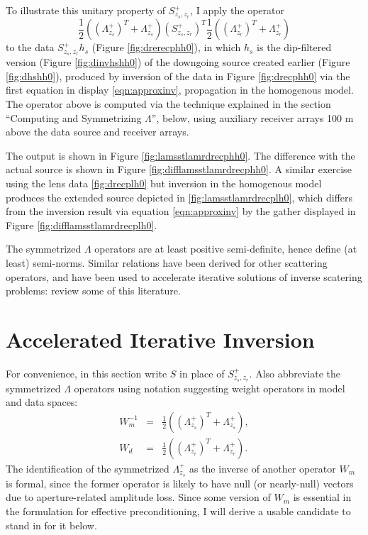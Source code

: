 To illustrate this unitary property of $S^+_{z_s,z_r}$, I apply the
operator
\[
  \frac{1}{2}((\Lambda^+_{z_s})^T+ \Lambda^+_{z_s})
  (S^{+}_{z_s,z_r})^T \frac{1}{2}((\Lambda^+_{z_r})^T+
  \Lambda^+_{z_r})
\]
to the data $S^+_{z_s,z_r}h_s$ (Figure \ref{fig:drerecphh0}), in which
$h_s$ is the dip-filtered version (Figure \ref{fig:dinvhshh0}) of the
downgoing source created earlier (Figure \ref{fig:dhshh0}), produced
by inversion of the data in Figure \ref{fig:drecphh0} via the first
equation in display \ref{eqn:approxinv}, propagation in the homogenous
model.  The operator above is computed via the technique explained in
the section ``Computing and Symmetrizing $\Lambda$'', below, using
auxiliary receiver arrays 100 m above the data source and receiver arrays.

The output is shown in Figure
\ref{fig:lamsstlamrdrecphh0}. The difference with the actual source is
shown in Figure \ref{fig:difflamsstlamrdrecphh0}. A similar exercise
using the lens data \ref{fig:drecplh0} but inversion in the homogenous
model produces the extended source depicted in
\ref{fig:lamsstlamrdrecplh0}, which differs from the inversion result
via equation \ref{eqn:approxinv} by the gather displayed in Figure
\ref{fig:difflamsstlamrdrecplh0}.

The symmetrized $\Lambda$ operators are at least positive
semi-definite, hence define (at least) semi-norms.
Similar relations have been derived for other scattering operators,
and have been used to accelerate iterative solutions of inverse
scatering problems: \cite{DafniSymes:SEG18b} review some of this
literature.

\section{Accelerated Iterative Inversion}

For convenience, in this section write $S$ in place of
$S^+_{z_s,z_r}$. Also abbreviate the symmetrized $\Lambda$ operators
using notation suggesting weight
operators in model and data spaces:
\begin{eqnarray}
  W_m^{-1}&=& \frac{1}{2}((\Lambda^+_{z_s})^T+
              \Lambda^+_{z_s}),\nonumber \\
  W_d &=& \frac{1}{2}((\Lambda^+_{z_r})^T+ \Lambda^+_{z_r}).
          \label{eqn:wdef}
\end{eqnarray}
The identification of the symmetrized $\Lambda^+_{z_s}$ as the inverse
of another operator $W_m$ is formal, since the former operator is
likely to have null (or nearly-null) vectors due to aperture-related
amplitude loss. Since some version of $W_m$ is essential in the
formulation for effective preconditioning, I will derive a usable
candidate to stand in for it below.

